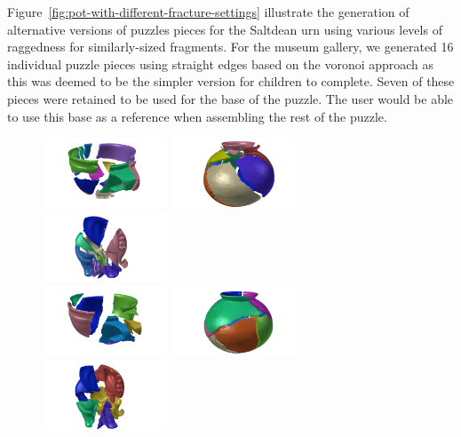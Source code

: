 \documentclass[acmlarge,screen,dvipsnames]{acmart}
\begin{document}
Figure~\ref{fig:pot-with-different-fracture-settings} illustrate the
generation of alternative versions of puzzles pieces for the Saltdean
urn using various levels of raggedness for similarly-sized
fragments. For the museum gallery, we generated 16 individual puzzle
pieces using straight edges based on the voronoi approach as this was
deemed to be the simpler version for children to complete. Seven of
these pieces were retained to be used for the base of the puzzle. The
user would be able to use this base as a reference when assembling the
rest of the puzzle.

\begin{figure}[htb]
  \includegraphics[width=0.33\textwidth]{images/ambercuppuzzle0}%
  \includegraphics[width=0.33\textwidth]{images/saltdeanpuzzle0}%
  \includegraphics[width=0.33\textwidth]{images/elephantpuzzle0}\\
  \includegraphics[width=0.33\textwidth]{images/ambercuppuzzle2}%
  \includegraphics[width=0.33\textwidth]{images/saltdeanpuzzle1}%
  \includegraphics[width=0.33\textwidth]{images/elephantpuzzle1}\\

\end{figure}
\end{document}
